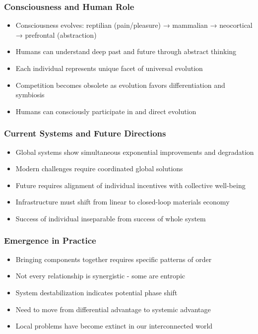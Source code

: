 \begin{frame}[fragile]\frametitle{Consciousness and Human Role}
	\begin{itemize}
	\item Consciousness evolves: reptilian (pain/pleasure) → mammalian → neocortical → prefrontal (abstraction)
	\item Humans can understand deep past and future through abstract thinking
	\item Each individual represents unique facet of universal evolution
	\item Competition becomes obsolete as evolution favors differentiation and symbiosis
	\item Humans can consciously participate in and direct evolution
	\end{itemize}
\end{frame}

\begin{frame}[fragile]\frametitle{Current Systems and Future Directions}
	\begin{itemize}
	\item Global systems show simultaneous exponential improvements and degradation
	\item Modern challenges require coordinated global solutions
	\item Future requires alignment of individual incentives with collective well-being
	\item Infrastructure must shift from linear to closed-loop materials economy
	\item Success of individual inseparable from success of whole system
	\end{itemize}
\end{frame}

\begin{frame}[fragile]\frametitle{Emergence in Practice}
	\begin{itemize}
	\item Bringing components together requires specific patterns of order
	\item Not every relationship is synergistic - some are entropic
	\item System destabilization indicates potential phase shift
	\item Need to move from differential advantage to systemic advantage
	\item Local problems have become extinct in our interconnected world
	\end{itemize}
\end{frame}


